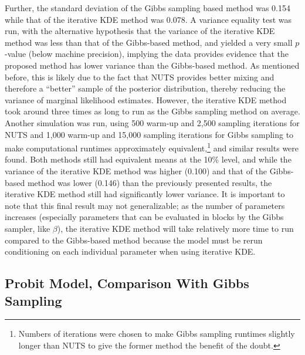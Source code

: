\documentclass[twocolumn]{article}
\begin{document}
Further, the standard deviation of the Gibbs sampling based method was 0.154 while that of the iterative KDE method was 0.078. A variance equality test was run, with the alternative hypothesis that the variance of the iterative KDE method was less than that of the Gibbs-based method, and yielded a very small $p$-value (below machine precision), implying the data provides evidence that the proposed method has lower variance than the Gibbs-based method. As mentioned before, this is likely due to the fact that NUTS provides better mixing and therefore a ``better'' sample of the posterior distribution, thereby reducing the variance of marginal likelihood estimates. However, the iterative KDE method took around three times as long to run as the Gibbs sampling method on average. Another simulation was run, using 500 warm-up and 2,500 sampling iterations for NUTS and 1,000 warm-up and 15,000 sampling iterations for Gibbs sampling to make computational runtimes approximately equivalent,\footnote{Numbers of iterations were chosen to make Gibbs sampling runtimes slightly longer than NUTS to give the former method the benefit of the doubt.} and similar results were found. Both methods still had equivalent means at the 10\% level, and while the variance of the iterative KDE method was higher (0.100) and that of the Gibbs-based method was lower (0.146) than the previously presented results, the iterative KDE method still had significantly lower variance. It is important to note that this final result may not generalizable; as the number of parameters increases (especially parameters that can be evaluated in blocks by the Gibbs sampler, like $\beta$), the iterative KDE method will take relatively more time to run compared to the Gibbs-based method because the model must be rerun conditioning on each individual parameter when using iterative KDE.

\subsection{Probit Model, Comparison With Gibbs Sampling}
\end{document}
